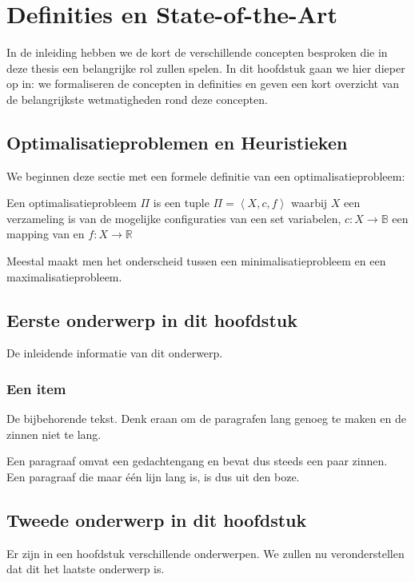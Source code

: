 \chapter{Definities en State-of-the-Art}
\label{hoofdstuk:1}

In de inleiding hebben we de kort de verschillende concepten besproken die in deze thesis een belangrijke rol zullen spelen. In dit hoofdstuk gaan we hier dieper op in: we formaliseren de concepten in definities en geven een kort overzicht van de belangrijkste wetmatigheden rond deze concepten.

\section{Optimalisatieproblemen en Heuristieken}

We beginnen deze sectie met een formele definitie van een optimalisatieprobleem:

\begin{definition}[Optimalisatieprobleem]
Een optimalisatieprobleem $\Pi$ is een tuple $\Pi=\left\langle X,c,f\right\rangle$ waarbij $X$ een verzameling is van de mogelijke configuraties van een set variabelen, $c:X\rightarrow\mathbb{B}$ een mapping van  en $f:X\rightarrow\mathbb{R}$
\end{definition}

Meestal maakt men het onderscheid tussen een minimalisatieprobleem en een maximalisatieprobleem.

\section{Eerste onderwerp in dit hoofdstuk}
De inleidende informatie van dit onderwerp.

\subsection{Een item}
De bijbehorende tekst. Denk eraan om de paragrafen lang genoeg te maken en
de zinnen niet te lang.

Een paragraaf omvat een gedachtengang en bevat dus steeds een paar zinnen.
Een paragraaf die maar \'e\'en lijn lang is, is dus uit den boze.

\section{Tweede onderwerp in dit hoofdstuk}
Er zijn in een hoofdstuk verschillende onderwerpen. We zullen nu
veronderstellen dat dit het laatste onderwerp is.

